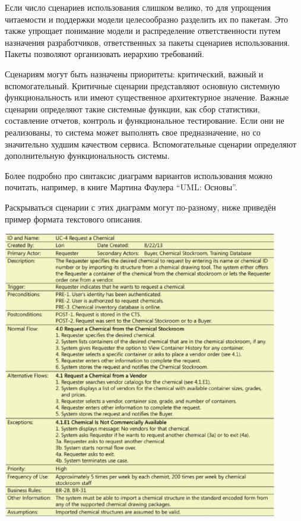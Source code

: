 \documentclass{../../text-style}
\begin{document}
Если число сценариев использования слишком велико, то для упрощения читаемости и поддержки модели целесообразно разделить их по пакетам.
Это также упрощает понимание модели и распределение ответственности путем назначения разработчиков, ответственных за пакеты сценариев использования.
Пакеты позволяют организовать иерархию требований.

Сценариям могут быть назначены приоритеты: критический, важный и вспомогательный.
Критичные сценарии представляют основную системную функциональность или имеют существенное архитектурное значение.
Важные сценарии определяют такие системные функции, как сбор статистики, составление отчетов, контроль и функциональное тестирование.
Если они не реализованы, то система может выполнять свое предназначение, но со значительно худшим качеством сервиса.
Вспомогательные сценарии определяют дополнительную функциональность системы.

Более подробно про синтаксис диаграмм вариантов использования можно почитать, например, в книге Мартина Фаулера \enquote{UML: Основы}.

Раскрываться сценарии с этих диаграмм могут по-разному, ниже приведён пример формата текстового описания.

\begin{center}
    \includegraphics[width=0.9\textwidth]{userScenarioFull.png}
\end{center}
\end{document}

